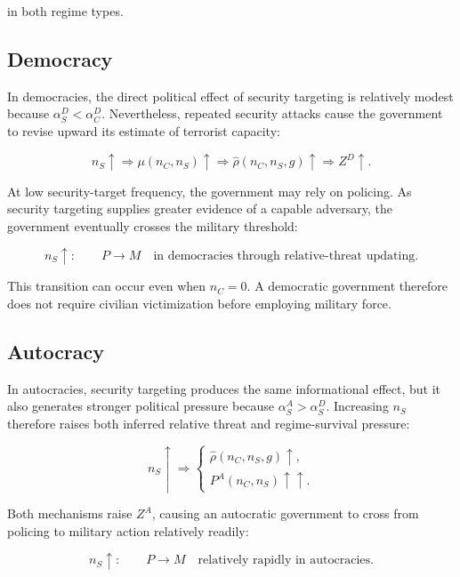 \documentclass[
  letterpaper,
  DIV=11,
  numbers=noendperiod]{scrartcl}
\begin{document}
in both regime types.

\subsection{Democracy}\label{democracy-1}

In democracies, the direct political effect of security targeting is
relatively modest because \(\alpha_S^D<\alpha_C^D\). Nevertheless,
repeated security attacks cause the government to revise upward its
estimate of terrorist capacity:

\[
n_S\uparrow
\Rightarrow
\mu(n_C,n_S)\uparrow
\Rightarrow
\widehat{\rho}(n_C,n_S,g)\uparrow
\Rightarrow
Z^D\uparrow.
\]

At low security-target frequency, the government may rely on policing.
As security targeting supplies greater evidence of a capable adversary,
the government eventually crosses the military threshold:

\[
\boxed{
n_S\uparrow:
\qquad
P\longrightarrow M
\quad\text{in democracies through relative-threat updating}.}
\]

This transition can occur even when \(n_C=0\). A democratic government
therefore does not require civilian victimization before employing
military force.

\subsection{Autocracy}\label{autocracy-1}

In autocracies, security targeting produces the same informational
effect, but it also generates stronger political pressure because
\(\alpha_S^A>\alpha_S^D\). Increasing \(n_S\) therefore raises both
inferred relative threat and regime-survival pressure:

\[
n_S\uparrow
\Rightarrow
\begin{cases}
\widehat{\rho}(n_C,n_S,g)\uparrow,\\
P^A(n_C,n_S)\uparrow\uparrow.
\end{cases}
\]

Both mechanisms raise \(Z^A\), causing an autocratic government to cross
from policing to military action relatively readily:

\[
\boxed{
n_S\uparrow:
\qquad
P\longrightarrow M
\quad\text{relatively rapidly in autocracies}.}
\]
\end{document}
